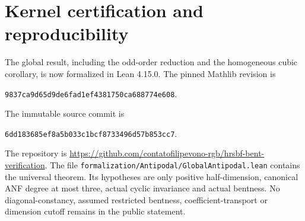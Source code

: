 \documentclass[11pt,a4paper]{article}
\theoremstyle{remark}
\theoremstyle{plain}
\begin{document}
\section{Kernel certification and reproducibility}
The global result, including the odd-order reduction and the homogeneous cubic corollary, is now formalized in Lean 4.15.0. The pinned Mathlib revision is
\begin{center}\small\nolinkurl{9837ca9d65d9de6fad1ef4381750ca688774e608}.\end{center}
The immutable source commit is
\begin{center}\small\nolinkurl{6dd183685ef8a5b033c1bcf8733496d57b853cc7}.\end{center}
The repository is \url{https://github.com/contatofilipevono-rgb/hrsbf-bent-verification}. The file \nolinkurl{formalization/Antipodal/GlobalAntipodal.lean} contains the universal theorem. Its hypotheses are only positive half-dimension, canonical ANF degree at most three, actual cyclic invariance and actual bentness. No diagonal-constancy, assumed restricted bentness, coefficient-transport or dimension cutoff remains in the public statement.
\end{document}
